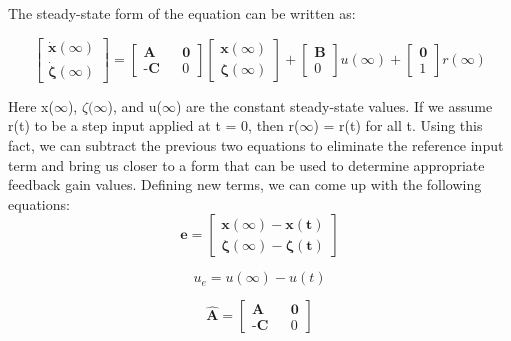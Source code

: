 \documentclass[titlepage]{article}
\begin{document}
The steady-state form of the equation can be written as:

\begin{equation}
\begin{bmatrix}
\mathbf{\dot x(\infty)} \\
\boldsymbol{\dot \zeta(\infty)}
\end{bmatrix}
=
\begin{bmatrix}
\textbf{A} && \textbf{0} \\
\textbf{-C} && 0
\end{bmatrix}
\begin{bmatrix}
\boldsymbol{x(\infty)} \\
\boldsymbol{\zeta(\infty)}
\end{bmatrix}
+
\begin{bmatrix}
\textbf{B} \\ 0
\end{bmatrix}
u(\infty)
+
\begin{bmatrix}
\textbf{0} \\ 1
\end{bmatrix}
r(\infty)
\end{equation}

Here x($\infty$), $\zeta(\infty$), and u($\infty$) are the constant steady-state values. If we assume r(t) to be a step input applied at t = 0, then r($\infty$) = r(t) for all t. Using this fact, we can subtract the previous two equations to eliminate the reference input term and bring us closer to a form that can be used to determine appropriate feedback gain values. Defining new terms, we can come up with the following equations:
\begin{equation}
   \textbf{e} = 
   \begin{bmatrix}
       \mathbf{x(\infty) - x(t)} \\ \boldsymbol{\zeta(\infty)-\zeta(t)}
   \end{bmatrix}   
\end{equation}

\begin{equation}
   u_{e} = u(\infty) - u(t)
\end{equation}

\begin{equation}
    \mathbf{\hat{A}} = 
    \begin{bmatrix}
        \textbf{A} && \textbf{0}\\
        \textbf{-C} && 0
    \end{bmatrix}
\end{equation}
\end{document}
